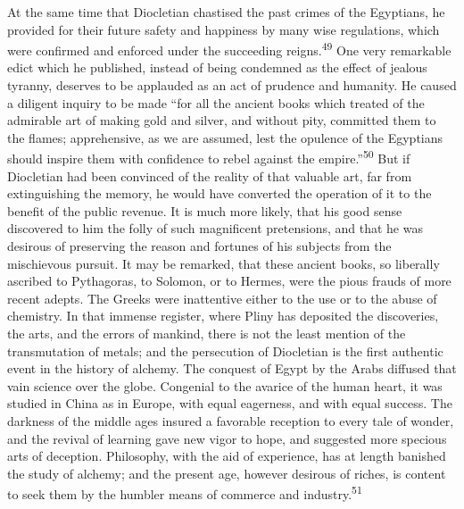 At the same time that Diocletian chastised the past crimes of the
Egyptians, he provided for their future safety and happiness by
many wise regulations, which were confirmed and enforced under
the succeeding reigns.\textsuperscript{49} One very remarkable edict which he
published, instead of being condemned as the effect of jealous
tyranny, deserves to be applauded as an act of prudence and
humanity. He caused a diligent inquiry to be made “for all the
ancient books which treated of the admirable art of making gold
and silver, and without pity, committed them to the flames;
apprehensive, as we are assumed, lest the opulence of the
Egyptians should inspire them with confidence to rebel against
the empire.”\textsuperscript{50} But if Diocletian had been convinced of the
reality of that valuable art, far from extinguishing the memory,
he would have converted the operation of it to the benefit of the
public revenue. It is much more likely, that his good sense
discovered to him the folly of such magnificent pretensions, and
that he was desirous of preserving the reason and fortunes of his
subjects from the mischievous pursuit. It may be remarked, that
these ancient books, so liberally ascribed to Pythagoras, to
Solomon, or to Hermes, were the pious frauds of more recent
adepts. The Greeks were inattentive either to the use or to the
abuse of chemistry. In that immense register, where Pliny has
deposited the discoveries, the arts, and the errors of mankind,
there is not the least mention of the transmutation of metals;
and the persecution of Diocletian is the first authentic event in
the history of alchemy. The conquest of Egypt by the Arabs
diffused that vain science over the globe. Congenial to the
avarice of the human heart, it was studied in China as in Europe,
with equal eagerness, and with equal success. The darkness of the
middle ages insured a favorable reception to every tale of
wonder, and the revival of learning gave new vigor to hope, and
suggested more specious arts of deception. Philosophy, with the
aid of experience, has at length banished the study of alchemy;
and the present age, however desirous of riches, is content to
seek them by the humbler means of commerce and industry.\textsuperscript{51}



